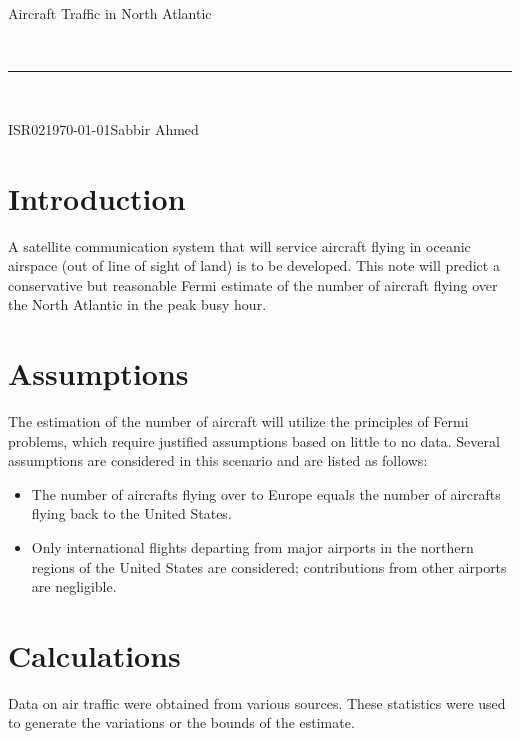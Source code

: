 \documentclass[11pt]{article}
\newcommand{\header}[5]{
	\begin{centering}
		\parbox{6.8in}{
			\begin{flushright}
				\begin{spacing}{.8}{
					\fontfamily{cmss}{\large{\textbf{#1}}\\}}
					\small{
						#2\\
					}
				\end{spacing}
			\end{flushright}
		\vspace{-7.5mm}
		}\\
		\rule{\textwidth}{0.5pt}\\
		\vspace{-4mm}
	\end{centering}
}
\newcommand{\documentinfo}[5]{
	\begin{centering}
		\parbox{6.8in}{
		\begin{spacing}{1}
			\begin{flushleft}
				\begin{tabular}{l l}
					\fontfamily{cmss}{\textbf{DOC \#: }} & #1 \\
					\fontfamily{cmss}{\textbf{DATE: }} & #2 \\
					\fontfamily{cmss}{\textbf{BY: }} & #3 \\
				\end{tabular}\\
				\rule{\textwidth}{1pt}
			\end{flushleft}
		\end{spacing}
		}
	\end{centering}
}
\begin{document}
	\header{CMPE349}{Aircraft Traffic in North Atlantic}{}{}

	\documentinfo{ISR02}{\today}{Sabbir Ahmed}{}

	\section{Introduction}
	A satellite communication system that will service aircraft flying in oceanic airspace (out of line of sight of land) is to be developed. This note will predict a conservative but reasonable Fermi estimate of the number of aircraft flying over the North Atlantic in the peak busy hour.
 
	\section{Assumptions}
	The estimation of the number of aircraft will utilize the principles of Fermi problems, which require justified assumptions based on little to no data. Several assumptions are considered in this scenario and are listed as follows:

	\begin{itemize}

		\item The number of aircrafts flying over to Europe equals the number of aircrafts flying back to the United States.

		\item Only international flights departing from major airports in the northern regions of the United States are considered; contributions from other airports are negligible.

	\end{itemize}

	\section{Calculations}
	Data on air traffic were obtained from various sources. These statistics were used to generate the variations or the bounds of the estimate.
\end{document}
